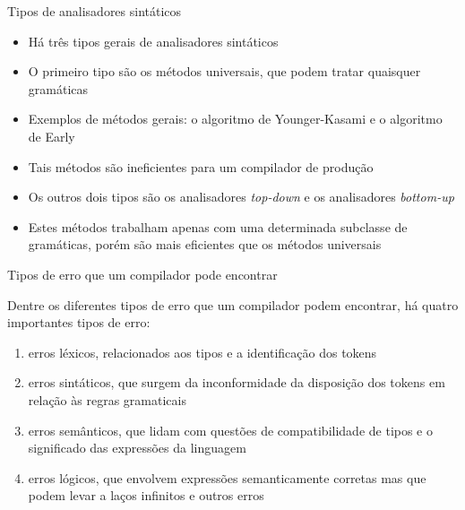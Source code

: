 \begin{frame}[fragile]{Tipos de analisadores sintáticos}

    \begin{itemize}
        \item Há três tipos gerais de analisadores sintáticos

        \item O primeiro tipo são os métodos universais, que podem tratar quaisquer gramáticas

        \item Exemplos de métodos gerais: o algoritmo de Younger-Kasami e o algoritmo de Early

        \item Tais métodos são ineficientes para um compilador de produção

        \item Os outros dois tipos são os analisadores \textit{top-down} e os analisadores \textit{bottom-up}

        \item Estes métodos trabalham apenas com uma determinada subclasse de gramáticas, porém são mais eficientes que os métodos universais
    \end{itemize}

\end{frame}

\begin{frame}[fragile]{Tipos de erro que um compilador pode encontrar}

    Dentre os diferentes tipos de erro que um compilador podem encontrar, há quatro importantes tipos de erro:

    \vspace{0.1in}

    \begin{enumerate}
        \item erros léxicos, relacionados aos tipos e a identificação dos tokens

        \item erros sintáticos, que surgem da inconformidade da disposição dos tokens em relação às regras gramaticais

        \item erros semânticos, que lidam com questões de compatibilidade de tipos e o significado das expressões da linguagem

        \item erros lógicos, que envolvem expressões semanticamente corretas mas que podem levar a laços infinitos e outros erros
    \end{enumerate}

\end{frame}

